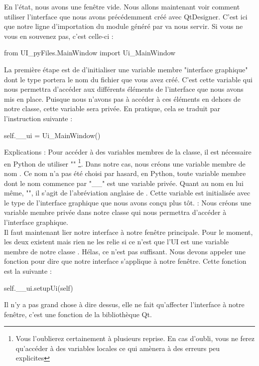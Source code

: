 {En l'état, nous avons une fenêtre vide. Nous allons maintenant voir comment utiliser l'interface que nous avons précédemment créé avec QtDesigner.\newline
C'est ici que notre ligne d'importation du module généré par  va nous servir. Si vous ne vous en souvenez pas, c'est celle-ci :
\begin{Python}
from UI_pyFiles.MainWindow import Ui_MainWindow
\end{Python}
La première étape est de d'initialiser une variable membre "interface graphique" dont le type portera le nom du fichier  que vous avez créé.\newline
C'est cette variable qui nous permettra d'accéder aux différents éléments de l'interface que nous avons mis en place.\newline
Puisque nous n'avons pas à accéder à ces éléments en dehors de notre classe, cette variable sera privée.\newline
En pratique, cela se traduit par l'instruction suivante :
\begin{Python}
self.__ui = Ui_MainWindow()
\end{Python}
Explications : 
Pour accéder à des variables membres de la classe, il est nécessaire en Python de  utiliser ""
\footnote{Vous l'oublierez certainement à plusieurs reprise. En cas d'oubli, vous ne ferez qu'accéder à des variables locales ce qui amènera à des erreurs peu explicites}. Dans notre cas, nous créons une variable membre de nom .\newline
Ce nom n'a pas été choisi par hasard, en Python, toute variable membre dont le nom commence par "\_\_" est une variable privée. Quant au nom en lui même,  "", il s'agit de l'abréviation anglaise de .\newline
Cette variable est initialisée avec le type de l'interface graphique que nous avons conçu plus tôt.\newline
{} : Nous créons une variable membre privée dans notre classe qui nous permettra d'accéder à l'interface graphique.\\

Il faut maintenant lier notre interface à notre fenêtre principale. Pour le moment, les deux existent mais rien ne les relie si ce n'est que l'UI est une variable membre de notre classe . Hélas, ce n'est pas suffisant. Nous devons appeler une fonction pour dire que notre interface s'applique à notre fenêtre. Cette fonction est la suivante :
\begin{Python}
self.__ui.setupUi(self)
\end{Python}
Il n'y a pas grand chose à dire dessus, elle ne fait qu'affecter l'interface à notre fenêtre, c'est une fonction de la bibliothèque Qt.\\

}
